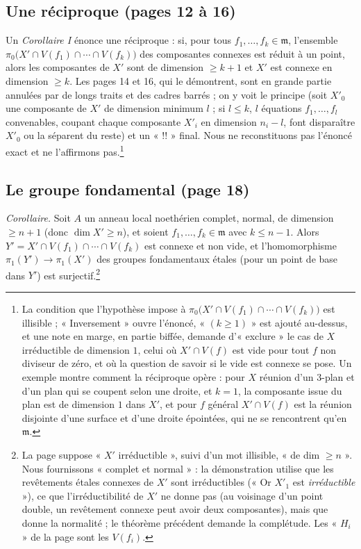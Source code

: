 \documentclass[11pt,a4paper]{article}
\begin{document}
\subsection*{Une réciproque (pages 12 à 16)}

Un \emph{Corollaire I} énonce une réciproque : si, pour tous
$f_1, \ldots, f_k \in \mathfrak{m}$, l'ensemble
$\pi_0\bigl(X' \cap V(f_1) \cap \cdots \cap V(f_k)\bigr)$ des composantes
connexes est réduit à un point, alors les composantes de $X'$ sont de
dimension $\geq k+1$ et $X'$ est connexe en dimension $\geq k$. Les pages 14 et
16, qui le démontrent, sont en grande partie annulées par de longs traits et
des cadres barrés ; on y voit le principe (soit $X'_0$ une composante de
$X'$ de dimension minimum $l$ ; si $l \leq k$, $l$ équations
$f_1, \ldots, f_l$ convenables, coupant chaque composante $X'_i$ en dimension
$n_i - l$, font disparaître $X'_0$ ou la séparent du reste) et un « !! »
final. Nous ne reconstituons pas l'énoncé exact et ne l'affirmons
pas.\footnote{La condition que l'hypothèse impose à
$\pi_0\bigl(X' \cap V(f_1) \cap \cdots \cap V(f_k)\bigr)$ est illisible ;
« Inversement » ouvre l'énoncé, « $(k \geq 1)$ » est ajouté au-dessus, et
une note en marge, en partie biffée, demande d'« exclure » le cas
de $X$ irréductible de dimension $1$, celui où $X' \cap V(f)$ est vide pour
tout $f$ non diviseur de zéro, et où la question de savoir si le vide est
connexe se pose. Un exemple montre comment la réciproque opère : pour $X$
réunion d'un $3$-plan et d'un plan qui se coupent selon une droite, et $k = 1$,
la composante issue du plan est de dimension $1$ dans $X'$, et pour $f$ général
$X' \cap V(f)$ est la réunion disjointe d'une surface et d'une droite
épointées, qui ne se rencontrent qu'en $\mathfrak{m}$.}

\subsection*{Le groupe fondamental (page 18)}

\emph{Corollaire.} Soit $A$ un anneau local noethérien complet, normal, de
dimension $\geq n+1$ (donc $\dim X' \geq n$), et soient
$f_1, \ldots, f_k \in \mathfrak{m}$ avec $k \leq n-1$. Alors
$Y' = X' \cap V(f_1) \cap \cdots \cap V(f_k)$ est connexe et non vide, et
l'homomorphisme $\pi_1(Y') \to \pi_1(X')$ des groupes fondamentaux étales
(pour un point de base dans $Y'$) est surjectif.\footnote{La page suppose
« $X'$ irréductible », suivi d'un mot illisible, « de dim $\geq n$ ». Nous
fournissons « complet et normal » : la démonstration utilise que les
revêtements étales connexes de $X'$ sont irréductibles (« Or $X'_1$ est
\emph{irréductible} »), ce que l'irréductibilité de $X'$ ne donne pas (au
voisinage d'un point double, un revêtement connexe peut avoir deux
composantes), mais que donne la normalité ; le théorème précédent demande
la complétude. Les « $H_i$ » de la page sont les $V(f_i)$.}
\end{document}
